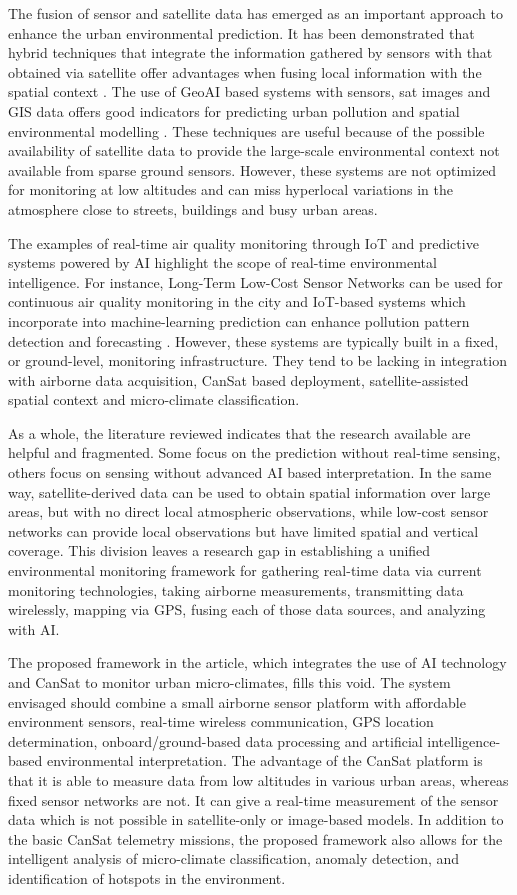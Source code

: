 \documentclass[conference]{IEEEtran}
\begin{document}
The fusion of sensor and satellite data has emerged as an important approach to enhance the urban environmental prediction. It has been demonstrated that hybrid techniques that integrate the information gathered by sensors with that obtained via satellite offer advantages when fusing local information with the spatial context \cite{x11}. The use of GeoAI based systems with sensors, sat images and GIS data offers good indicators for predicting urban pollution and spatial environmental modelling \cite{x12}. These techniques are useful because of the possible availability of satellite data to provide the large-scale environmental context not available from sparse ground sensors. However, these systems are not optimized for monitoring at low altitudes and can miss hyperlocal variations in the atmosphere close to streets, buildings and busy urban areas.

The examples of real-time air quality monitoring through IoT and predictive systems powered by AI highlight the scope of real-time environmental intelligence. For instance, Long-Term Low-Cost Sensor Networks can be used for continuous air quality monitoring in the city \cite{x13} and IoT-based systems which incorporate into machine-learning prediction can enhance pollution pattern detection and forecasting \cite{x14}. However, these systems are typically built in a fixed, or ground-level, monitoring infrastructure. They tend to be lacking in integration with airborne data acquisition, CanSat based deployment, satellite-assisted spatial context and micro-climate classification.

As a whole, the literature reviewed indicates that the research available are helpful and fragmented. Some focus on the prediction without real-time sensing, others focus on sensing without advanced AI based interpretation. In the same way, satellite-derived data can be used to obtain spatial information over large areas, but with no direct local atmospheric observations, while low-cost sensor networks can provide local observations but have limited spatial and vertical coverage. This division leaves a research gap in establishing a unified environmental monitoring framework for gathering real-time data via current monitoring technologies, taking airborne measurements, transmitting data wirelessly, mapping via GPS, fusing each of those data sources, and analyzing with AI.

The proposed framework in the article, which integrates the use of AI technology and CanSat to monitor urban micro-climates, fills this void. The system envisaged should combine a small airborne sensor platform with affordable environment sensors, real-time wireless communication, GPS location determination, onboard/ground-based data processing and artificial intelligence-based environmental interpretation. The advantage of the CanSat platform is that it is able to measure data from low altitudes in various urban areas, whereas fixed sensor networks are not. It can give a real-time measurement of the sensor data which is not possible in satellite-only or image-based models. In addition to the basic CanSat telemetry missions, the proposed framework also allows for the intelligent analysis of micro-climate classification, anomaly detection, and identification of hotspots in the environment.
\end{document}
